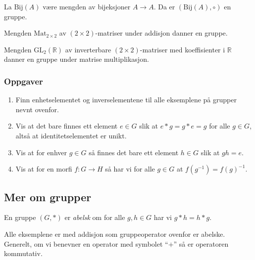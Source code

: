 \begin{example}
    La $\mathrm{Bij}(A)$ være mengden av bijeksjoner $A\to A$.
    Da er $(\mathrm{Bij}(A), \circ)$ en gruppe.
\end{example}

\begin{example}
    Mengden $\mathrm{Mat}_{2\times 2}$ av $(2\times 2)$-matriser under addisjon
    danner en gruppe.
\end{example}

\begin{example}
    Mengden $\mathrm{GL}_2(\mathbb R)$ av inverterbare $(2\times2)$-matriser
    med koeffisienter i $\mathbb R$
    danner en gruppe under matrise multiplikasjon.
\end{example}


\subsubsection*{Oppgaver}
\begin{enumerate}
    \item Finn enhetselementet og inverselementene til alle eksemplene på
        grupper nevnt ovenfor.
    \item Vis at det bare finnes ett element $e\in G$ slik
        at $e \ast g = g\ast e = g$ for alle $g\in G$,
        altså at identitetselementet er unikt.
    \item Vis at for enhver $g\in G$ så finnes det bare ett element
        $h\in G$ slik at $gh = e$.
    \item Vis at for en morfi $f\colon G\to H$
        så har vi for alle $g\in G$ at $f(g^{-1}) = {f(g)}^{-1}$.
\end{enumerate}

\subsection{Mer om grupper}

\begin{definition}
    En gruppe $(G, \ast)$ er \textit{abelsk} om
    for alle $g,h\in G$ har vi $g\ast h = h\ast g$.
\end{definition}

\begin{example}
    Alle eksemplene er med addisjon som gruppeoperator ovenfor er abelske.
    Generelt, om vi benevner en operator med symbolet ``$+$'' så er operatoren
    kommutativ.
\end{example}


